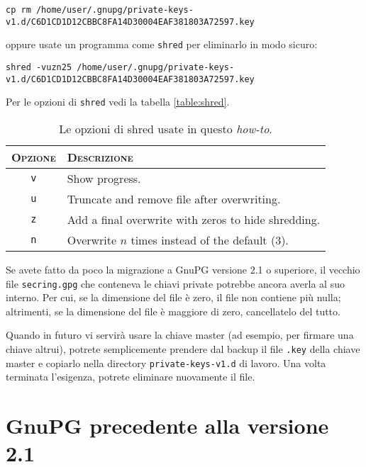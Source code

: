 \begin{lstlisting}
cp rm /home/user/.gnupg/private-keys-v1.d/C6D1CD1D12CBBC8FA14D30004EAF381803A72597.key
\end{lstlisting}

\noindent oppure usate un programma come \texttt{shred} per eliminarlo in modo
sicuro:

\begin{lstlisting}
shred -vuzn25 /home/user/.gnupg/private-keys-v1.d/C6D1CD1D12CBBC8FA14D30004EAF381803A72597.key
\end{lstlisting}

Per le opzioni di \texttt{shred} vedi la tabella \vref{table:shred}.

\begin{table}
    \centering
    \begin{tabularx}{1\textwidth}{c l}
        \toprule
        \textsc{Opzione} & \textsc{Descrizione} \\
        \midrule
        \texttt{v} & Show progress. \\
        \texttt{u} & Truncate and remove file after overwriting. \\
        \texttt{z} & Add a final overwrite with zeros to hide shredding. \\
        \texttt{n} & Overwrite $n$ times instead of the default (3). \\
        \bottomrule
    \end{tabularx}
    \caption{Le opzioni di shred usate in questo \textit{how-to}.}
    \label{table:shred}
\end{table}

Se avete fatto da poco la migrazione a GnuPG versione 2.1 o superiore, il
vecchio file \texttt{secring.gpg} che conteneva le chiavi private potrebbe
ancora averla al suo interno. Per cui, se la dimensione del file è zero, il file
non contiene più nulla; altrimenti, se la dimensione del file è maggiore di
zero, cancellatelo del tutto.

Quando in futuro vi servirà usare la chiave master (ad esempio, per firmare una
chiave altrui), potrete semplicemente prendere dal backup il file \texttt{.key}
della chiave master e copiarlo nella directory \texttt{private-keys-v1.d} di
lavoro. Una volta terminata l'esigenza, potrete eliminare nuovamente il file.

\section{GnuPG precedente alla versione 2.1}

